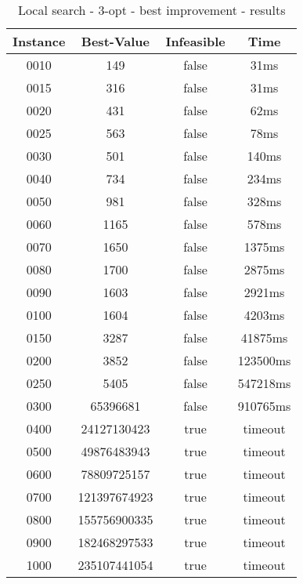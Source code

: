 \begin{table}
\centering
	\begin{tabular}{|| c | c | c | c ||} 
		\hline
		Instance & Best-Value & Infeasible & Time \\
		\hline\hline
0010 & 149 & false & 31ms \\
0015 & 316 & false & 31ms \\
0020 & 431 & false & 62ms \\
0025 & 563 & false & 78ms \\
0030 & 501 & false & 140ms \\
0040 & 734 & false & 234ms \\
0050 & 981 & false & 328ms \\
0060 & 1165 & false & 578ms \\
0070 & 1650 & false & 1375ms \\
0080 & 1700 & false & 2875ms \\
0090 & 1603 & false & 2921ms \\
0100 & 1604 & false & 4203ms \\
0150 & 3287 & false & 41875ms \\
0200 & 3852 & false & 123500ms \\
0250 & 5405 & false & 547218ms \\
0300 & 65396681 & false & 910765ms \\
0400 & 24127130423 & true & timeout \\
0500 & 49876483943 & true & timeout \\
0600 & 78809725157 & true & timeout \\
0700 & 121397674923 & true & timeout \\
0800 & 155756900335 & true & timeout \\
0900 & 182468297533 & true & timeout \\
1000 & 235107441054 & true & timeout \\
		\hline
	\end{tabular}
\caption{Local search - 3-opt - best improvement - results}
\end{table}

